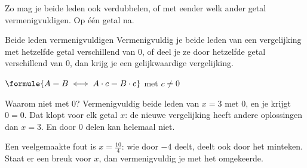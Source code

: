 
Zo mag je beide leden ook verdubbelen, of met eender welk ander getal vermenigvuldigen. Op één getal na.

\begin{theorie}
\begin{stelling}{Beide leden vermenigvuldigen}
Vermenigvuldig je beide leden van een vergelijking met hetzelfde getal verschillend van 0, of deel je ze door hetzelfde getal verschillend van 0, dan krijg je een gelijkwaardige vergelijking.

\vspace{1mm}
\qquad $\formule{A = B \iff A \cdot c = B \cdot c}$ \qquad met $c \neq 0$
\end{stelling}
\end{theorie}

Waarom niet met 0? Vermenigvuldig beide leden van $x = 3$ met 0, en je krijgt $0 = 0$. Dat klopt voor elk getal $x$: de nieuwe vergelijking heeft andere oplossingen dan $x = 3$. En door 0 delen kan helemaal niet.


Een veelgemaakte fout is $x = \tfrac{10}{4}$: wie door $-4$ deelt, deelt ook door het minteken. Staat er een breuk voor $x$, dan vermenigvuldig je met het omgekeerde.


